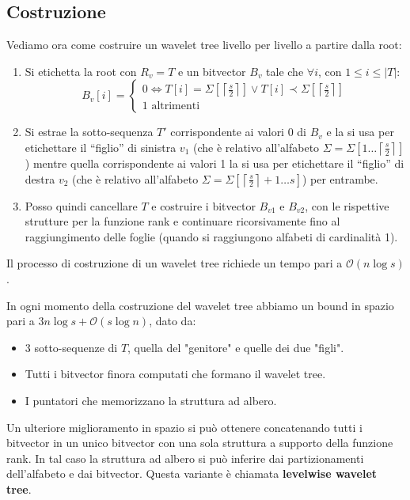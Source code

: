 \subsection{Costruzione}
Vediamo ora come costruire un wavelet tree livello per livello a partire dalla
root:
\begin{enumerate}
    \item Si etichetta la root con $R_v = T$ e un bitvector $B_v$ tale che
          $\forall i$, con $1 \leq i \leq |T|$:
          \begin{equation}
              B_v[i] = \begin{cases}
                  0 \iff T[i] = \Sigma\left[\left\lceil \frac{s}{2}
                      \right\rceil\right] \lor T[i] \prec \Sigma\left[
                  \left\lceil \frac{s}{2} \right\rceil\right] \\
                  1 \text{ altrimenti}
              \end{cases}
          \end{equation}
    \item Si estrae la sotto-sequenza $T'$ corrispondente ai valori 0 di $B_v$ e
          la si usa per etichettare il ``figlio'' di sinistra $v_1$ (che è relativo
          all'alfabeto $\Sigma = \Sigma\left[1 \dots \left\lceil \frac{s}{2}
                  \right\rceil\right]$) mentre quella corrispondente ai valori 1
          la si usa per etichettare il ``figlio'' di destra $v_2$ (che è relativo
          all'alfabeto $\Sigma = \Sigma\left[\left\lceil \frac{s}{2} \right\rceil
                  + 1 \dots s \right]$) per entrambe.
    \item Posso quindi cancellare $T$ e costruire i bitvector $B_{v1}$ e $B_{v2}$,
          con le rispettive strutture per la funzione rank e continuare
          ricorsivamente fino al raggiungimento delle foglie (quando si
          raggiungono alfabeti di cardinalità 1).
\end{enumerate}
Il processo di costruzione di un wavelet tree richiede un tempo pari a
$\mathcal{O}(n \log s)$.

In ogni momento della costruzione del wavelet tree abbiamo un bound in spazio
pari a $3n \log s + \mathcal{O}(s \log n)$, dato da:
\begin{itemize}
    \item 3 sotto-sequenze di $T$, quella del "genitore" e quelle dei due "figli".
    \item Tutti i bitvector finora computati che formano il wavelet tree.
    \item I puntatori che memorizzano la struttura ad albero.
\end{itemize}
Un ulteriore miglioramento in spazio si può ottenere concatenando tutti i bitvector
in un unico bitvector con una sola struttura a supporto della funzione rank. In
tal caso la struttura ad albero si può inferire dai partizionamenti dell'alfabeto
e dai bitvector. Questa variante è chiamata \textbf{levelwise wavelet tree}.

